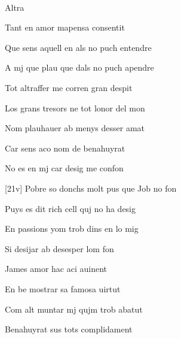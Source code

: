 \documentclass[12pt]{article}
\renewcommand{\espaiAbansEtiquetaPoema}{\vspace{0ex}}
\begin{document}
\begin{estrofa}

\espaiAbansEtiquetaPoema

\\

\begin{rubrica}

Altra

\end{rubrica}

\end{estrofa}


\begin{estrofa}

 Tant en amor mapensa consentit

 Que sens aquell en als no puch entendre

 A mj que plau que dals no puch apendre

 Tot altraffer me corren gran despit

 Los grans tresors ne tot lonor del mon

 Nom plauhauer ab menys desser amat

 Car sens aco nom de benahuyrat

 No es en mj car desig me confon

\end{estrofa}



\begin{estrofa}

 [21v] Pobre so donchs molt pus que Job no fon

 Puys es dit rich cell quj no ha desig

 En passions yom trob dins en lo mig

 Si desijar ab desesper lom fon

 James amor hac aci auinent

 En be mostrar sa famosa uirtut

 Com alt muntar mj qujm trob abatut

 Benahuyrat sus tots complidament

\end{estrofa}
\end{document}
